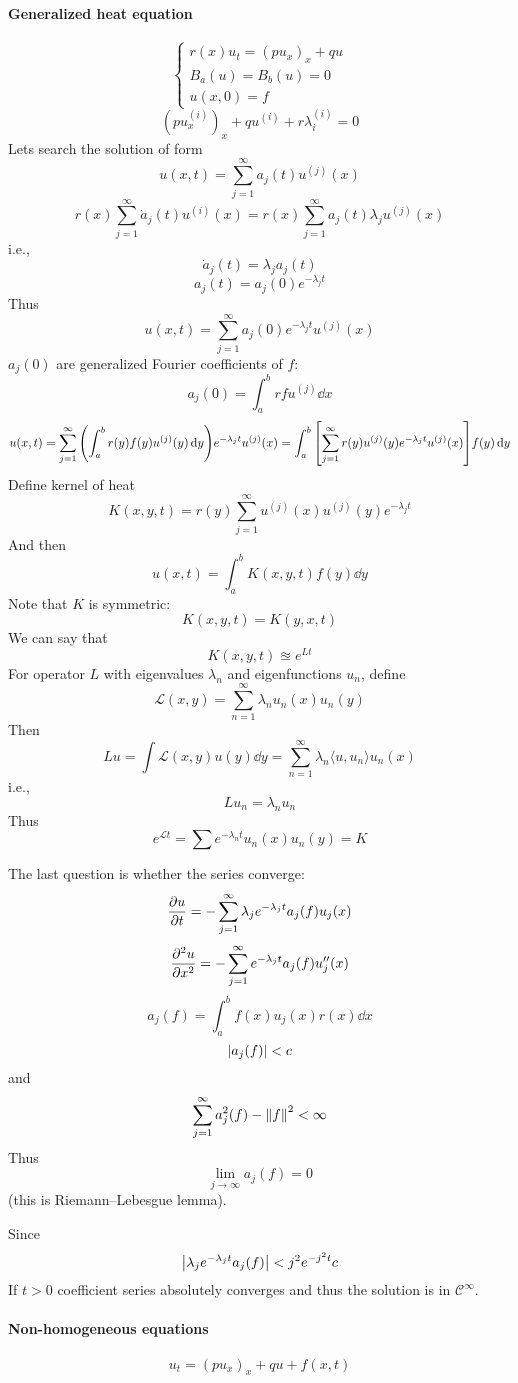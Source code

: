 \paragraph{Generalized heat equation}
$$\begin{cases}
r(x)u_t = (pu_x)_x + qu\\B_a(u)= B_b(u) = 0\\u(x,0)=  f
\end{cases}$$
$$(pu_x^{(i)})_x + qu^{(i)} + r\lambda_i ^{(i)} = 0$$
Lets search the solution of form
$$u(x,t) = \sum_{j=1}^\infty a_j(t) u^{(j)}(x)$$
$$r(x)  \sum_{j=1}^\infty \dot{a}_j(t) u^{(i)}(x) = r(x)  \sum_{j=1}^\infty a_j(t) \lambda_j u^{(j)}(x)$$
i.e.,
$$\dot{a}_j(t) = \lambda_j a_j(t)$$
$$a_j(t) = a_j(0) e^{-\lambda_j t}$$
Thus
$$u(x,t) = \sum_{j=1}^\infty a_j(0) e^{-\lambda_j t} u^{(j)}(x)$$
$a_j(0)$ are generalized Fourier coefficients of $f$:
$$a_j(0) = \int_a^b rfu^{(j)} \dd{x}$$
$$u(x,t) = \sum_{j=1}^\infty \qty(\int_a^b r(y)f(y) u^{(j)}(y) \dd{y})e^{-\lambda_j t} u^{(j)}(x) = \int_a^b \qty[\sum_{j=1}^\infty r(y) u^{(j)}(y) e^{-\lambda_j t} u^{(j)}(x) ]f(y)\dd{y} $$
Define kernel of heat
$$K(x,y,t) = r(y)\sum_{j=1}^\infty u^{(j)}(x) u^{(j)}(y) e^{-\lambda_j t}  $$
And then
$$u(x,t) = \int_a^b K(x,y,t) f(y) \dd{y}$$
Note that $K$ is symmetric:
$$K(x,y,t) = K(y,x,t)$$
We can say that
$$K(x,y,t) \approxeq e^{Lt}$$
For operator $L$ with eigenvalues $\lambda_n$ and eigenfunctions $u_n$, define
$$\mathcal{L}(x,y) =  \sum_{n=1}^\infty \lambda_n u_n(x) u_n(y)$$
Then
$$Lu = \int \mathcal{L}(x,y) u(y) \dd{y} = \sum_{n=1}^\infty \lambda_n \langle u, u_n \rangle u_n(x)$$
i.e.,
$$Lu_n = \lambda_n u_n$$
Thus
$$e^{\mathcal{L} t} = \sum e^{-\lambda_n t} u_n(x) u_n(y) = K$$

The last question is whether the series converge:
$$\pdv{u}{t} = -\sum_{j=1}^\infty \lambda_j e^{-\lambda_j t} a_j(f) u_j(x)$$ 
$$\pdv[2]{u}{x} = -\sum_{j=1}^\infty e^{-\lambda_j t} a_j(f) u''_j(x)$$
$$a_j(f) = \int_a^b f(x) u_j(x) r(x) \dd{x}$$
$$\abs{a_j(f)}  < c$$
and
$$\sum_{j=1}^\infty a_j^2(f) - \norm{f}^2 < \infty$$
Thus
$$\lim_{j\to \infty} a_j(f) = 0$$
(this is Riemann–Lebesgue lemma).

Since
$$\abs{ \lambda_j e^{-\lambda_j t} a_j(f)} < j^2 e^{-j^2 t} c $$
If $t>0$ coefficient series absolutely converges and thus the solution is in $\mathcal{C}^\infty$.
\paragraph{Non-homogeneous equations}
$$u_t = (pu_x)_x + qu + f(x,t)$$


